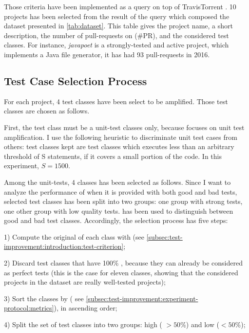 

Those criteria have been implemented as a query on top of TravisTorrent \cite{msr17challenge}. 
10 projects has been selected from the result of the query which composed the dataset presented in \autoref{tab:dataset}.
This table gives the project name, a short description, the number of pull-requests on \gh (\#PR), and the considered test classes.
For instance, \emph{javapoet} is a strongly-tested and active project, which implements a Java file generator, it has had 93 pull-requests in 2016.


\subsection{Test Case Selection Process}
\label{subsec:test-improvement:experiment-protocol:test-preparation}

For each project, 4 test classes have been select to be amplified. 
Those test classes are chosen as follows.

First, the test class must be a unit-test classes only, because \dspot focuses on unit test amplification. 
I use the following heuristic to discriminate unit test cases from others: 
test classes kept are test classes which executes less than an arbitrary threshold of S statements, \ie if it covers a small portion of the code.
In this experiment, $S=1500$.

Among the unit-tests, 4 classes has been selected as follows.
Since I want to analyze the performance of \dspot when it is provided with both good and bad tests, selected test classes has been split into two groups: 
one group with strong tests, one other group with low quality tests.
\ms has been used to distinguish between good and bad test classes.
Accordingly, the selection process has five steps:

1) Compute the original \ms of each class with \pitest (see \autoref{subsec:test-improvement:introduction:test-criterion};

2) Discard test classes that have 100\% \ms, because they can already be considered as perfect tests 
(this is the case for eleven classes, showing that the considered projects in the dataset are really well-tested projects);

3) Sort the classes by \ms ( see \autoref{subsec:test-improvement:experiment-protocol:metrics}), in ascending order;

4) Split the set of test classes into two groups: high \ms( $> 50\%$) and low \ms  ($< 50\%$);

